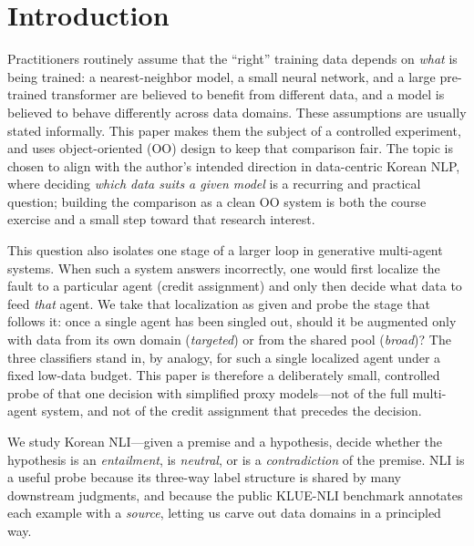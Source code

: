 \documentclass[conference]{IEEEtran}
\begin{document}
\section{Introduction}
\label{sec:intro}

Practitioners routinely assume that the ``right'' training data depends
on \emph{what} is being trained: a nearest-neighbor model, a small
neural network, and a large pre-trained transformer are believed to
benefit from different data, and a model is believed to behave
differently across data domains. These assumptions are usually stated
informally. This paper makes them the subject of a controlled
experiment, and uses object-oriented (OO) design to keep that comparison
fair. The topic is chosen to align with the
author's intended direction in data-centric Korean NLP, where deciding
\emph{which data suits a given model} is a recurring and practical
question; building the comparison as a clean OO system is both the
course exercise and a small step toward that research interest.

This question also isolates one stage of a larger loop in generative
multi-agent systems. When such a system answers incorrectly, one would
first localize the fault to a particular agent (credit assignment) and
only then decide what data to feed \emph{that} agent. We take that
localization as given and probe the stage that follows it: once a single
agent has been singled out, should it be augmented only with data from
its own domain (\emph{targeted}) or from the shared pool (\emph{broad})?
The three classifiers stand in, by analogy, for such a single localized
agent under a fixed low-data budget. This paper is therefore a
deliberately small, controlled probe of that one decision with simplified
proxy models---not of the full multi-agent system, and not of the credit
assignment that precedes the decision.

We study Korean NLI---given a premise and a hypothesis, decide whether
the hypothesis is an \emph{entailment}, is \emph{neutral}, or is a
\emph{contradiction} of the premise. NLI is a useful probe because its
three-way label structure is shared by many downstream judgments, and
because the public KLUE-NLI benchmark \cite{park2021klue} annotates each
example with a \emph{source}, letting us carve out data domains in a
principled way.
\end{document}
